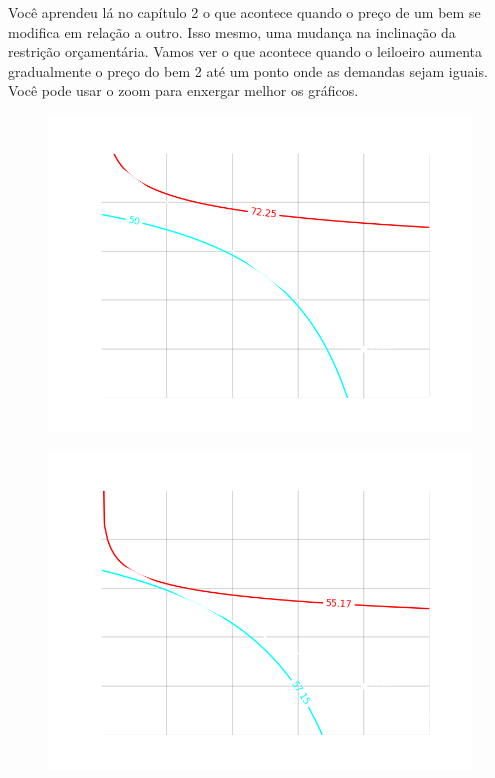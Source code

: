 \documentclass[a4paper,11pt,oneside]{book}
\theoremstyle{definition}
\theoremstyle{break}
\begin{document}
\newpage

Você aprendeu lá no capítulo 2 o que acontece quando o preço de um bem se modifica em relação a outro. Isso mesmo, uma mudança na inclinação da restrição orçamentária. Vamos ver o que acontece quando o leiloeiro aumenta gradualmente o preço do bem 2 até um ponto onde as demandas sejam iguais. Você pode usar o zoom para enxergar melhor os gráficos.

\begin{figure}[H]
\centering
\includegraphics[scale=0.45]{cap32_4-caixa_edgeworth_4.png}
\end{figure}

\begin{figure}[H]
\centering
\includegraphics[scale=0.45]{cap32_4-caixa_edgeworth_5.png}
\end{figure}
\end{document}

